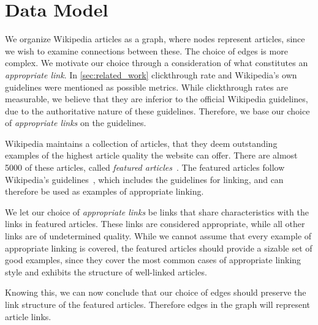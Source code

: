 \section{Data Model}\label{sec:choice_of_graph}
We organize Wikipedia articles as a graph, where nodes represent articles, since we wish to examine connections between these. The choice of edges is more complex. We motivate our choice through a consideration of what constitutes an \emph{appropriate link}. In \cref{sec:related_work} clickthrough rate and Wikipedia's own guidelines were mentioned as possible metrics. While clickthrough rates are measurable, we believe that they are inferior to the official Wikipedia guidelines, due to the authoritative nature of these guidelines. Therefore, we base our choice of \emph{appropriate links} on the guidelines.

Wikipedia maintains a collection of articles, that they deem outstanding examples of the highest article quality the website can offer. There are almost 5000 of these articles, called \emph{featured articles}~\cite{wiki-featured-articles}. The featured articles follow Wikipedia's guidelines~\cite{wiki-editor-guidelines}, which includes the guidelines for linking, and can therefore be used as examples of appropriate linking.%

We let our choice of \emph{appropriate links} be links that share characteristics with the links in featured articles. These links are considered appropriate, while all other links are of undetermined quality. 
While we cannot assume that every example of appropriate linking is covered, the featured articles should provide a sizable set of good examples, since they cover the most common cases of appropriate linking style and exhibits the structure of well-linked articles.


Knowing this, we can now conclude that our choice of edges should preserve the link structure of the featured articles. Therefore edges in the graph will represent article links. 

